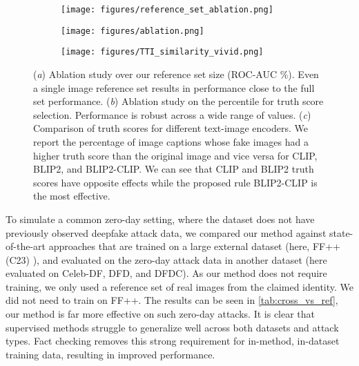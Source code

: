 \documentclass{article} \usepackage{iclr2024_conference,times}
\begin{document}
\begin{figure}
     \centering
      \begin{subfigure}[b]{0.29\textwidth}
     \centering
     \texttt{[image: figures/reference\_set\_ablation.png]}
     \vspace{-1.5em}
     \caption{}
     \label{fig:reference_set_ablation}
     \end{subfigure}
     \hfill
\begin{subfigure}[b]{0.325\textwidth}
         \centering
         \texttt{[image: figures/ablation.png]}
         \vspace{-1.5em}
         \caption{}
         \label{fig:av_ablation}
     \end{subfigure}
     \hfill
\begin{subfigure}[b]{0.36\textwidth}
         \centering
         \texttt{[image: figures/TTI\_similarity\_vivid.png]}
         \vspace{-1.5em}
         \caption{}
         \label{fig:tti}
     \end{subfigure}
\caption{(\textit{a}) Ablation study over our reference set size (ROC-AUC \%). Even a single image reference set results in performance close to the full set performance. (\textit{b}) Ablation study on the percentile  for truth score selection. Performance is robust across a wide range of values. (\textit{c}) Comparison of truth scores for different text-image encoders. We report the percentage of image captions whose fake images had a higher truth score than the original image and vice versa for CLIP, BLIP2, and BLIP2-CLIP. We can see that CLIP and BLIP2 truth scores have opposite effects while the proposed rule BLIP2-CLIP is the most effective.}
        \vspace{-0.5em}
\end{figure}


To simulate a common zero-day setting, where the dataset does not have previously observed deepfake attack data, we compared our method against state-of-the-art approaches that are trained on a large external dataset (here, FF++(C23) \citep{learning3_ff++}), and evaluated on the zero-day attack data in another dataset (here evaluated on Celeb-DF, DFD, and DFDC). As our method does not require training, we only used a reference set of real images from the claimed identity. We did not need to train on FF++. The results can be seen in \cref{tab:cross_vs_ref}, our method is far more effective on such zero-day attacks. It is clear that supervised methods struggle to generalize well across both datasets and attack types. Fact checking removes this strong requirement for in-method, in-dataset training data, resulting in improved performance.    
\end{document}
